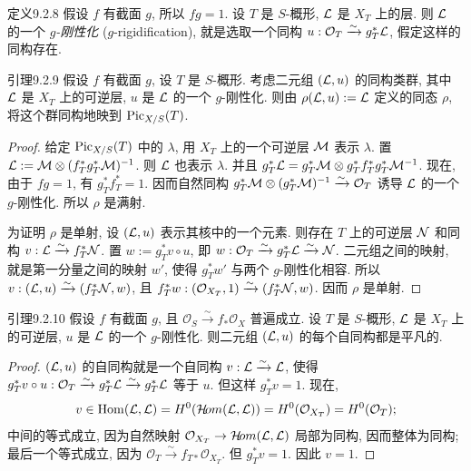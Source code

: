 \begin{origstatement}{定义}{9.2.8}\label{ch09s02:def928}
假设 $f$ 有截面 $g$, 所以 $fg=1$. 设 $T$ 是 $S$-概形, $\mathcal L$ 是 $X_T$ 上的层. 则 $\mathcal L$ 的一个 \emph{$g$-刚性化} ($g$-rigidification), 就是选取一个同构 $u:\mathcal O_T\xrightarrow{\sim}g_T^*\mathcal L$, 假定这样的同构存在.
\end{origstatement}

\begin{origstatement}{引理}{9.2.9}\label{ch09s02:lem929}
假设 $f$ 有截面 $g$, 设 $T$ 是 $S$-概形. 考虑二元组 $(\mathcal L,u)$ 的同构类群, 其中 $\mathcal L$ 是 $X_T$ 上的可逆层, $u$ 是 $\mathcal L$ 的一个 $g$-刚性化. 则由 $\rho(\mathcal L,u):=\mathcal L$ 定义的同态 $\rho$, 将这个群同构地映到 $\operatorname{Pic}_{X/S}(T)$.
\end{origstatement}
\begin{proof}
给定 $\operatorname{Pic}_{X/S}(T)$ 中的 $\lambda$, 用 $X_T$ 上的一个可逆层 $\mathcal M$ 表示 $\lambda$. 置 $\mathcal L:=\mathcal M\otimes(f_T^*g_T^*\mathcal M)^{-1}$. 则 $\mathcal L$ 也表示 $\lambda$. 并且 $g_T^*\mathcal L=g_T^*\mathcal M\otimes g_T^*f_T^*g_T^*\mathcal M^{-1}$. 现在, 由于 $fg=1$, 有 $g_T^*f_T^*=1$. 因而自然同构 $g_T^*\mathcal M\otimes(g_T^*\mathcal M)^{-1}\xrightarrow{\sim}\mathcal O_T$ 诱导 $\mathcal L$ 的一个 $g$-刚性化. 所以 $\rho$ 是满射.

为证明 $\rho$ 是单射, 设 $(\mathcal L,u)$ 表示其核中的一个元素. 则存在 $T$ 上的可逆层 $\mathcal N$ 和同构 $v:\mathcal L\xrightarrow{\sim}f_T^*\mathcal N$. 置 $w:=g_T^*v\circ u$, 即 $w:\mathcal O_T\xrightarrow{\sim}g_T^*\mathcal L\xrightarrow{\sim}\mathcal N$. 二元组之间的映射, 就是第一分量之间的映射 $w'$, 使得 $g_T^*w'$ 与两个 $g$-刚性化相容. 所以 $v:(\mathcal L,u)\xrightarrow{\sim}(f_T^*\mathcal N,w)$, 且 $f_T^*w:(\mathcal O_{X_T},1)\xrightarrow{\sim}(f_T^*\mathcal N,w)$. 因而 $\rho$ 是单射.
\end{proof}

\begin{origstatement}{引理}{9.2.10}\label{ch09s02:lem9210}
假设 $f$ 有截面 $g$, 且 $\mathcal O_S\xrightarrow{\sim}f_*\mathcal O_X$ 普遍成立. 设 $T$ 是 $S$-概形, $\mathcal L$ 是 $X_T$ 上的可逆层, $u$ 是 $\mathcal L$ 的一个 $g$-刚性化. 则二元组 $(\mathcal L,u)$ 的每个自同构都是平凡的.
\end{origstatement}
\begin{proof}
$(\mathcal L,u)$ 的自同构就是一个自同构 $v:\mathcal L\xrightarrow{\sim}\mathcal L$, 使得 $g_T^*v\circ u:\mathcal O_T\xrightarrow{\sim}g_T^*\mathcal L\xrightarrow{\sim}g_T^*\mathcal L$ 等于 $u$. 但这样 $g_T^*v=1$. 现在,
\[
v\in\operatorname{Hom}(\mathcal L,\mathcal L)=H^0(\mathcal H\!om(\mathcal L,\mathcal L))=H^0(\mathcal O_{X_T})=H^0(\mathcal O_T);
\]
中间的等式成立, 因为自然映射 $\mathcal O_{X_T}\to\mathcal H\!om(\mathcal L,\mathcal L)$ 局部为同构, 因而整体为同构; 最后一个等式成立, 因为 $\mathcal O_T\xrightarrow{\sim}f_{T*}\mathcal O_{X_T}$. 但 $g_T^*v=1$. 因此 $v=1$.
\end{proof}


